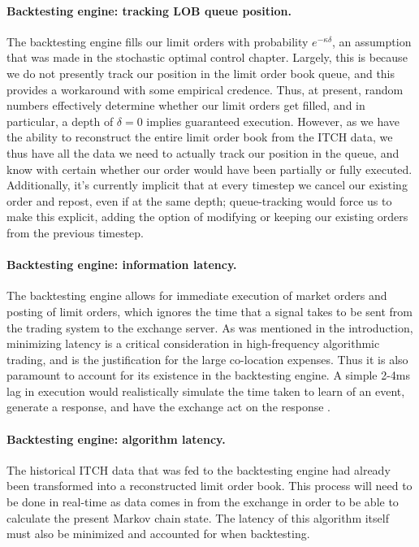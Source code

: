 \paragraph{Backtesting engine: tracking LOB queue position.} The backtesting engine fills our limit orders with probability $e^{-\kappa \delta}$, an assumption that was made in the stochastic optimal control chapter. Largely, this is because we do not presently track our position in the limit order book queue, and this provides a workaround with some empirical credence. Thus, at present, random numbers effectively determine whether our limit orders get filled, and in particular, a depth of $\delta=0$ implies guaranteed execution. However, as we have the ability to reconstruct the entire limit order book from the ITCH data, we thus have all the data we need to actually track our position in the queue, and know with certain whether our order would have been partially or fully executed. Additionally, it's currently implicit that at every timestep we cancel our existing order and repost, even if at the same depth; queue-tracking would force us to make this explicit, adding the option of modifying or keeping our existing orders from the previous timestep. 

\paragraph{Backtesting engine: information latency.} The backtesting engine allows for immediate execution of market orders and posting of limit orders, which ignores the time that a signal takes to be sent from the trading system to the exchange server. As was mentioned in the introduction, minimizing latency is a critical consideration in high-frequency algorithmic trading, and is the justification for the large co-location expenses. Thus it is also paramount to account for its existence in the backtesting engine. A simple 2-4ms lag in execution would realistically simulate the time taken to learn of an event, generate a response, and have the exchange act on the response \citep{hasbrouck2013low}. 

\paragraph{Backtesting engine: algorithm latency.} The historical ITCH data that was fed to the backtesting engine had already been transformed into a reconstructed limit order book. This process will need to be done in real-time as data comes in from the exchange in order to be able to calculate the present Markov chain state. The latency of this algorithm itself must also be minimized and accounted for when backtesting.